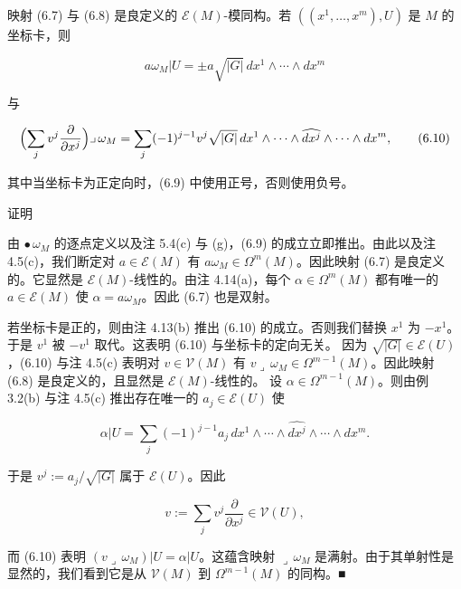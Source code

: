 \begin{lemma}

映射 (6.7) 与 (6.8) 是良定义的 $ \mathcal{E}(M) $-模同构。若 $ ((x^1,\ldots,x^m),U) $ 是 $ M $ 的坐标卡，则

\begin{equation}
a\omega_{M}|U = \pm a\sqrt{|G|}\,dx^{1}\wedge\cdots\wedge dx^{m}\tag{6.9}
\end{equation}

与

\begin{equation}
\Bigl(\sum_{j}v^{j}\frac{\partial}{\partial x^{j}}\Bigr)\lrcorner\,\omega_{M} = \sum_{j}(-1)^{j-1}v^{j}\sqrt{|G|}\,dx^{1}\wedge\cdots\wedge\widehat{dx^{j}}\wedge\cdots\wedge dx^{m},\tag{6.10}
\end{equation}

其中当坐标卡为正定向时，(6.9) 中使用正号，否则使用负号。

证明

\begin{subitems}
\item

由 $ \bullet\,\omega_M $ 的逐点定义以及注 5.4(c) 与 (g)，(6.9) 的成立立即推出。由此以及注 4.5(c)，我们断定对 $ a \in \mathcal{E}(M) $ 有 $ a\omega_M \in \Omega^{m}(M) $。因此映射 (6.7) 是良定义的。它显然是 $ \mathcal{E}(M) $-线性的。由注 4.14(a)，每个 $ \alpha \in \Omega^{m}(M) $ 都有唯一的 $ a \in \mathcal{E}(M) $ 使 $ \alpha = a\omega_M $。因此 (6.7) 也是双射。

\item

若坐标卡是正的，则由注 4.13(b) 推出 (6.10) 的成立。否则我们替换 $ x^1 $ 为 $ -x^1 $。于是 $ v^1 $ 被 $ -v^1 $ 取代。这表明 (6.10) 与坐标卡的定向无关。
因为 $ \sqrt{|G|} \in \mathcal{E}(U) $，(6.10) 与注 4.5(c) 表明对 $ v \in \mathcal{V}(M) $ 有 $ v\lrcorner\,\omega_M \in \Omega^{m-1}(M) $。因此映射 (6.8) 是良定义的，且显然是 $ \mathcal{E}(M) $-线性的。
设 $ \alpha \in \Omega^{m-1}(M) $。则由例 3.2(b) 与注 4.5(c) 推出存在唯一的 $ a_j \in \mathcal{E}(U) $ 使

\[
\alpha|U = \sum_{j}(-1)^{j-1}a_j\,dx^{1}\wedge\cdots\wedge\widehat{dx^{j}}\wedge\cdots\wedge dx^{m}.
\]

于是 $ v^{j} := a_j/\sqrt{|G|} $ 属于 $ \mathcal{E}(U) $。因此

\[
v := \sum_{j}v^{j}\frac{\partial}{\partial x^{j}} \in \mathcal{V}(U),
\]

而 (6.10) 表明 $ (v\lrcorner\,\omega_M)|U = \alpha|U $。这蕴含映射 $ \lrcorner\,\omega_M $ 是满射。由于其单射性是显然的，我们看到它是从 $ \mathcal{V}(M) $ 到 $ \Omega^{m-1}(M) $ 的同构。\nobreak\hspace{0.35em}■

\end{subitems}

\end{lemma}

